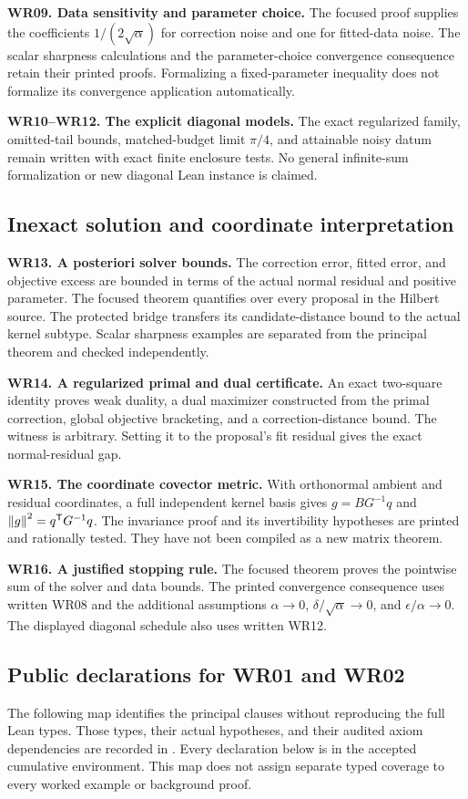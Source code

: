 \textbf{WR09. Data sensitivity and parameter choice.} The focused proof supplies the coefficients $1/(2\sqrt\alpha)$ for correction noise and one for fitted-data noise. The scalar sharpness calculations and the parameter-choice convergence consequence retain their printed proofs. Formalizing a fixed-parameter inequality does not formalize its convergence application automatically.

\textbf{WR10--WR12. The explicit diagonal models.} The exact regularized family, omitted-tail bounds, matched-budget limit $\pi/4$, and attainable noisy datum remain written with exact finite enclosure tests. No general infinite-sum formalization or new diagonal Lean instance is claimed.

\subsection{Inexact solution and coordinate interpretation}
\textbf{WR13. A posteriori solver bounds.} The correction error, fitted error, and objective excess are bounded in terms of the actual normal residual and positive parameter. The focused theorem quantifies over every proposal in the Hilbert source. The protected bridge transfers its candidate-distance bound to the actual kernel subtype. Scalar sharpness examples are separated from the principal theorem and checked independently.

\textbf{WR14. A regularized primal and dual certificate.} An exact two-square identity proves weak duality, a dual maximizer constructed from the primal correction, global objective bracketing, and a correction-distance bound. The witness is arbitrary. Setting it to the proposal's fit residual gives the exact normal-residual gap.

\textbf{WR15. The coordinate covector metric.} With orthonormal ambient and residual coordinates, a full independent kernel basis gives $g=BG^{-1}q$ and $\left\lVert g\right\rVert^2=q^{\mathsf T}G^{-1}q$. The invariance proof and its invertibility hypotheses are printed and rationally tested. They have not been compiled as a new matrix theorem.

\textbf{WR16. A justified stopping rule.} The focused theorem proves the pointwise sum of the solver and data bounds. The printed convergence consequence uses written WR08 and the additional assumptions $\alpha\to0$, $\delta/\sqrt\alpha\to0$, and $\epsilon/\alpha\to0$. The displayed diagonal schedule also uses written WR12.

\subsection{Public declarations for WR01 and WR02}\label{app:wr-source-map}
The following map identifies the principal clauses without reproducing the full Lean types. Those types, their actual hypotheses, and their audited axiom dependencies are recorded in . Every declaration below is in the accepted cumulative environment. This map does not assign separate typed coverage to every worked example or background proof.

